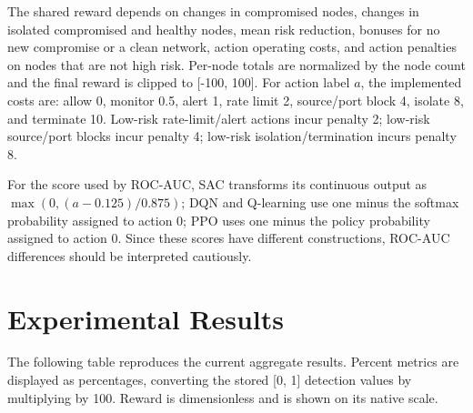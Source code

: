 \documentclass[12pt,a4paper]{report}
\begin{document}
The shared reward depends on changes in compromised nodes, changes in isolated compromised and healthy nodes, mean risk reduction, bonuses for no new compromise or a clean network, action operating costs, and action penalties on nodes that are not high risk. Per-node totals are normalized by the node count and the final reward is clipped to [-100, 100]. For action label $a$, the implemented costs are: allow 0, monitor 0.5, alert 1, rate limit 2, source/port block 4, isolate 8, and terminate 10. Low-risk rate-limit/alert actions incur penalty 2; low-risk source/port blocks incur penalty 4; low-risk isolation/termination incurs penalty 8.

For the score used by ROC-AUC, SAC transforms its continuous output as $\max(0,(a-0.125)/0.875)$; DQN and Q-learning use one minus the softmax probability assigned to action 0; PPO uses one minus the policy probability assigned to action 0. Since these scores have different constructions, ROC-AUC differences should be interpreted cautiously.

\section{Experimental Results}

The following table reproduces the current aggregate results. Percent metrics are displayed as percentages, converting the stored [0, 1] detection values by multiplying by 100. Reward is dimensionless and is shown on its native scale.

\begin{table}[htbp]
\centering
\caption{Current aggregate comparison results.}
\scriptsize
{}
\end{table}
\end{document}
